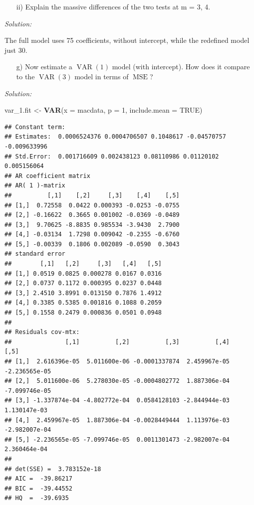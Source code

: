 \documentclass[12pt,a4paper]{article}
\newcommand{\MSE}{\operatorname{MSE}} %
\newcommand{\VAR}{\operatorname{VAR}} %
\newenvironment{Shaded}{\begin{snugshade}}{\end{snugshade}}
\newcommand{\DataTypeTok}[1]{\textcolor[rgb]{0.13,0.29,0.53}{#1}}
\newcommand{\DecValTok}[1]{\textcolor[rgb]{0.00,0.00,0.81}{#1}}
\newcommand{\FloatTok}[1]{\textcolor[rgb]{0.00,0.00,0.81}{#1}}
\newcommand{\KeywordTok}[1]{\textcolor[rgb]{0.13,0.29,0.53}{\textbf{#1}}}
\newcommand{\NormalTok}[1]{#1}
\newcommand{\OtherTok}[1]{\textcolor[rgb]{0.56,0.35,0.01}{#1}}
\newcommand{\StringTok}[1]{\textcolor[rgb]{0.31,0.60,0.02}{#1}}
\begin{document}
\begin{itemize}
  \item[ii)] Explain the massive differences of the two tests at m = {3, 4}.
\end{itemize}

\emph{Solution:}

The full model uses 75 coefficients, without intercept, while the
redefined model just 30.

\begin{itemize}
  \item[g)] Now estimate a $\VAR(1)$ model (with intercept). How does it compare to the $\VAR(3)$ model in terms of $\MSE$?
\end{itemize}

\emph{Solution:}

\begin{Shaded}
\begin{Highlighting}[]
\NormalTok{var_}\FloatTok{1.}\NormalTok{fit <-}\StringTok{ }\KeywordTok{VAR}\NormalTok{(}\DataTypeTok{x =}\NormalTok{ macdata, }\DataTypeTok{p =} \DecValTok{1}\NormalTok{, }\DataTypeTok{include.mean =} \OtherTok{TRUE}\NormalTok{)}
\end{Highlighting}
\end{Shaded}

\begin{verbatim}
## Constant term: 
## Estimates:  0.0006524376 0.0004706507 0.1048617 -0.04570757 -0.009633996 
## Std.Error:  0.001716609 0.002438123 0.08110986 0.01120102 0.005156064 
## AR coefficient matrix 
## AR( 1 )-matrix 
##          [,1]    [,2]     [,3]    [,4]    [,5]
## [1,]  0.72558  0.0422 0.000393 -0.0253 -0.0755
## [2,] -0.16622  0.3665 0.001002 -0.0369 -0.0489
## [3,]  9.70625 -8.8835 0.985534 -3.9430  2.7900
## [4,] -0.03134  1.7298 0.009042 -0.2355 -0.6760
## [5,] -0.00339  0.1806 0.002089 -0.0590  0.3043
## standard error 
##        [,1]   [,2]     [,3]   [,4]   [,5]
## [1,] 0.0519 0.0825 0.000278 0.0167 0.0316
## [2,] 0.0737 0.1172 0.000395 0.0237 0.0448
## [3,] 2.4510 3.8991 0.013150 0.7876 1.4912
## [4,] 0.3385 0.5385 0.001816 0.1088 0.2059
## [5,] 0.1558 0.2479 0.000836 0.0501 0.0948
##   
## Residuals cov-mtx: 
##               [,1]          [,2]          [,3]          [,4]          [,5]
## [1,]  2.616396e-05  5.011600e-06 -0.0001337874  2.459967e-05 -2.236565e-05
## [2,]  5.011600e-06  5.278030e-05 -0.0004802772  1.887306e-04 -7.099746e-05
## [3,] -1.337874e-04 -4.802772e-04  0.0584128103 -2.844944e-03  1.130147e-03
## [4,]  2.459967e-05  1.887306e-04 -0.0028449444  1.113976e-03 -2.982007e-04
## [5,] -2.236565e-05 -7.099746e-05  0.0011301473 -2.982007e-04  2.360464e-04
##   
## det(SSE) =  3.783152e-18 
## AIC =  -39.86217 
## BIC =  -39.44552 
## HQ  =  -39.6935
\end{verbatim}
\end{document}
